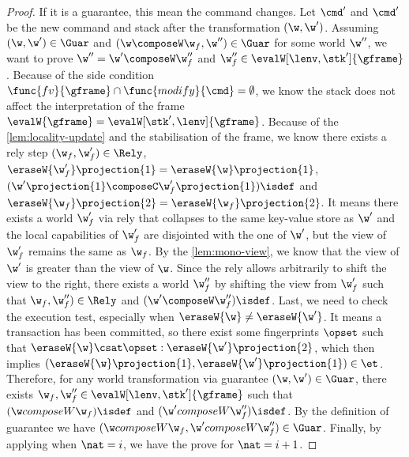 \begin{proof}
If it is a guarantee, this mean the command changes.
Let \( \cmd' \) and \( \cmd' \) be the new command and stack after the transformation \( (\w, \w') \).
Assuming \( (\w, \w') \in \Guar \) and \( (\w \composeW \w_f, \w'') \in \Guar \) for some world \( \w'' \), we want to prove \( \w''  = \w' \composeW \w_f'' \) and \( \w_f'' \in \evalW[\lenv, \stk']{\gframe} \).
Because of the side condition \( \func{fv}{\gframe} \cap \func{modify}{\cmd} = \emptyset \), we know the stack does not affect the interpretation of the frame \( \evalW{\gframe} = \evalW[\stk',\lenv]{\gframe}\).
Because of the \cref{lem:locality-update} and the stabilisation of the frame, we know there exists a rely step \( (\w_f, \w_{f}') \in \Rely \), \( \eraseW{\w_{f}'}\projection{1} = \eraseW{\w}\projection{1}\), \( (\w'\projection{1} \composeC \w'_{f}\projection{1})\isdef\) and \( \eraseW{\w_f}\projection{2} = \eraseW{\w_f}\projection{2}\).
It means there exists a world \( \w_{f}' \) via rely that collapses to the same key-value store as \( \w'\)  and the local capabilities of \( \w_{f}' \) are disjointed with the one of \( \w' \), but the view of \( \w_{f}' \)  remains the same as \( \w_f\).
By the \cref{lem:mono-view}, we know that the view of \( \w'\) is greater than the view of \( \w \).
Since the rely allows arbitrarily to shift the view to the right, there exists a world \( \w_f''\) by shifting the view from \( \w_f' \) such that \( \w_f, \w_f'') \in \Rely \) and \( (\w' \composeW \w_f'')\isdef \).
Last, we need to check the execution test, especially when \( \eraseW{\w} \neq \eraseW{\w'}\).
It means a transaction has been committed, so there exist some fingerprints \( \opset \) such that \( \eraseW{\w} \csat \opset : \eraseW{\w'}\projection{2}\), which then implies \( (\eraseW{\w}\projection{1},\eraseW{\w'}\projection{1}) \in \et \).
Therefore, for any world transformation via guarantee \( (\w, \w') \in \Guar \), there exists \( \w_f, \w_f'' \in \evalW[\lenv,\stk']{\gframe}\)  such that \( (\w composeW \w_f)\isdef\) and \( (\w' composeW \w_f'')\isdef\).
By the definition of guarantee we have \( (\w composeW \w_f, \w' composeW \w''_f) \in \Guar \).
Finally, by applying \ih when \( \nat = i \), we have the prove for \( \nat = i + 1 \).


\end{proof}
